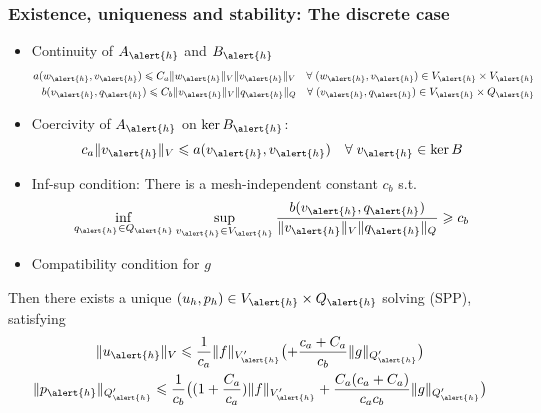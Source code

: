 \begin{frame}[shrink=5]
  \frametitle{Existence, uniqueness and stability: The discrete case}
  \begin{itemize}
    \item Continuity of $A_{\alert{h}}$ and $B_{\alert{h}}$
      \begin{align*}
        a(w_{\alert{h}},v_{\alert{h}}) \leqslant C_a \| w_{\alert{h}} \|_V \|v_{\alert{h}}\|_V \quad \foralls (w_{\alert{h}},v_{\alert{h}}) \in
        V_{\alert{h}} \times V_{\alert{h}} 
        \\
        b(v_{\alert{h}},q_{\alert{h}}) \leqslant C_b \| v_{\alert{h}} \|_V \|q_{\alert{h}}\|_Q \quad \foralls (v_{\alert{h}},q_{\alert{h}}) \in
        V_{\alert{h}} \times Q_{\alert{h}}
      \end{align*}
 \item Coercivity of $A_{\alert{h}}$ on $\Kern B_{\alert{h}}$:
 \[
   c_a \| v_{\alert{h}} \|_V \leqslant a(v_{\alert{h}},v_{\alert{h}}) \quad \foralls v_{\alert{h}} \in \Kern B 
 \]
 \item Inf-sup condition: There is a \alert{mesh-independent} constant
   $c_b$ s.t.
 \[
   \inf_{q_{\alert{h}} \in Q_{\alert{h}}} \sup_{v_{\alert{h}}\in V_{\alert{h}}} \dfrac{b(v_{\alert{h}},q_{\alert{h}})}{\|v_{\alert{h}}\|_V \|q_{\alert{h}}\|_Q}
   \geqslant c_b
 \]
 \item Compatibility condition for $g$
  \end{itemize}
  Then there exists a unique $(u_h,p_h) \in V_{\alert{h}}\times Q_{\alert{h}}$ solving
  (SPP), satisfying
  \begin{gather*}
    \| u_{\alert{h}} \|_V \leqslant \dfrac{1}{c_a} 
    \| f \|_{V_{\alert{h}}'} 
    \bigl(
    + \dfrac{c_a + C_a}{c_b} \|g\|_{Q_{\alert{h}}^{\prime}}
    \bigr)
    \\
    \| p_{\alert{h}} \|_{Q_{\alert{h}}'} \leqslant \dfrac{1}{c_b}
    \bigl(
    (1 + \dfrac{C_a}{c_a}) \| f \|_{V_{\alert{h}}'}
    +
    \dfrac{C_a(c_a + C_a)}{c_a c_b} \| g \|_{Q_{\alert{h}}'}
    \bigr)
  \end{gather*}
\end{frame}


